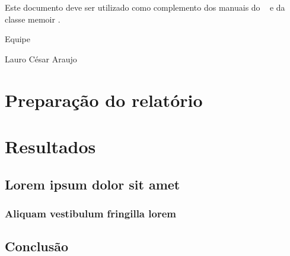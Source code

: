 \documentclass[
	12pt,				%
	openright,			%
	twoside,			%
	a4paper,			%
	english,			%
	french,				%
	spanish,			%
	brazil,				%
	]{abntex2}
\begin{document}
Este documento deve ser utilizado como complemento dos manuais do \abnTeX\ 
\cite{abntex2classe,abntex2cite,abntex2cite-alf} e da classe \textsf{memoir}
\cite{memoir}. 

Equipe \abnTeX 

Lauro César Araujo


\part{Preparação do relatório}





\part{Resultados}

\chapter{Lorem ipsum dolor sit amet}

\section{Aliquam vestibulum fringilla lorem}

\lipsum[1]

\lipsum[2-3]


\chapter{Conclusão}

\lipsum[31-33]

\postextual
\end{document}
